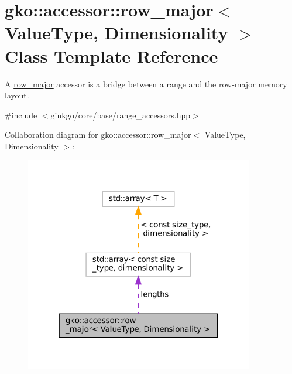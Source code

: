 \hypertarget{classgko_1_1accessor_1_1row__major}{}\section{gko\+:\+:accessor\+:\+:row\+\_\+major$<$ Value\+Type, Dimensionality $>$ Class Template Reference}
\label{classgko_1_1accessor_1_1row__major}


A \hyperlink{classgko_1_1accessor_1_1row__major}{row\+\_\+major} accessor is a bridge between a range and the row-\/major memory layout.  




{\ttfamily \#include $<$ginkgo/core/base/range\+\_\+accessors.\+hpp$>$}



Collaboration diagram for gko\+:\+:accessor\+:\+:row\+\_\+major$<$ Value\+Type, Dimensionality $>$\+:
\nopagebreak
\begin{figure}[H]
\begin{center}
\leavevmode
\includegraphics[width=283pt]{classgko_1_1accessor_1_1row__major__coll__graph}
\end{center}
\end{figure}
